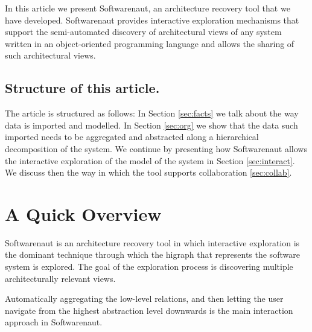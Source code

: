 \documentclass[preprint,12pt]{elsarticle}
\begin{document}
In this article we present Softwarenaut, an architecture recovery tool that we have developed. Softwarenaut provides interactive exploration mechanisms that support the semi-automated discovery of architectural views of any system written in an object-oriented programming language and allows the sharing of such architectural views. 

\subsection*{Structure of this article.} The article is structured as follows: In Section \ref{sec:facts} we talk about the way data is imported and modelled. In Section \ref{sec:org} we show that the data such imported needs to be aggregated and abstracted along a hierarchical decomposition of the system. We continue by presenting how Softwarenaut allows the interactive exploration of the model of the system in Section \ref{sec:interact}. We discuss then the way in which the tool supports collaboration \ref{sec:collab}. %



\section {A Quick Overview}
\label{sec:over}

Softwarenaut is an architecture recovery tool in which interactive exploration is the dominant technique through which the higraph that represents the software system is explored. The goal of the exploration process is discovering multiple architecturally relevant views. 

Automatically aggregating the low-level relations, and then letting the user navigate from the highest abstraction level downwards is the main interaction approach in Softwarenaut. 
\end{document}
